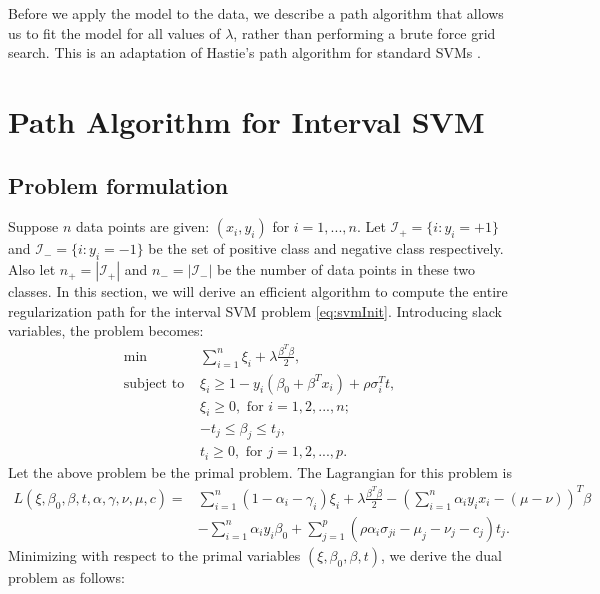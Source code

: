 \documentclass[10pt]{article}
\theoremstyle{definition}
\begin{document}
Before we apply the model to the data, we describe a path algorithm that allows us to fit the model for all values of $\lambda$, rather than performing a brute force grid search. This is an adaptation of Hastie's path algorithm for standard SVMs \cite{hastie2004entire}.

\section{Path Algorithm for Interval SVM}


\subsection{Problem formulation}
Suppose $n$ data points are given: $(x_i,y_i)$ for $i=1,...,n$. Let $\mathcal I_+ = \{i: y_i=+1\}$ and $\mathcal I_- = \{i: y_i=-1\}$ be the set of positive class and negative class respectively. Also let $n_+=|\mathcal I_+|$ and $n_-=|\mathcal I_-|$ be the number of data points in these two classes. In this section, we will derive an efficient algorithm to compute the entire regularization path for the interval SVM problem \eqref{eq:svmInit}.
Introducing slack variables, the problem becomes:
\begin{align}
\label{eq:primal}
\min & \sum_{i=1}^n\xi_i + \lambda\frac{\beta^T\beta}{2}, \\
\text{subject to } & \xi_i \geq 1 - y_i(\beta_0+\beta^Tx_i)+\rho \sigma_i^Tt,\nonumber \\
                   & \xi_i \geq 0, \text{ for }i=1,2,...,n; \nonumber\\
                   & -t_j\leq \beta_j \leq t_j,\nonumber\\
                   & t_i \geq 0, \text{ for } j=1,2,...,p. \nonumber                      
\end{align}
Let the above problem be the primal problem. The Lagrangian for this problem is
\[
\begin{array}{rl}
L(\xi,\beta_0,\beta,t,\alpha,\gamma,\nu,\mu,c)
= & \sum_{i=1}^n(1-\alpha_i-\gamma_i)\xi_i + \lambda\frac{\beta^T\beta}{2} - (\sum_{i=1}^n \alpha_iy_ix_i - (\mu-\nu))^T\beta \\
  & - \sum_{i=1}^n\alpha_iy_i\beta_0 + \sum_{j=1}^p(\rho\alpha_i\sigma_{ji} - \mu_j-\nu_j-c_j)t_j.
\end{array}
\]
Minimizing with respect to the primal variables $(\xi,\beta_0,\beta,t)$, we derive the dual problem as follows:
\end{document}
